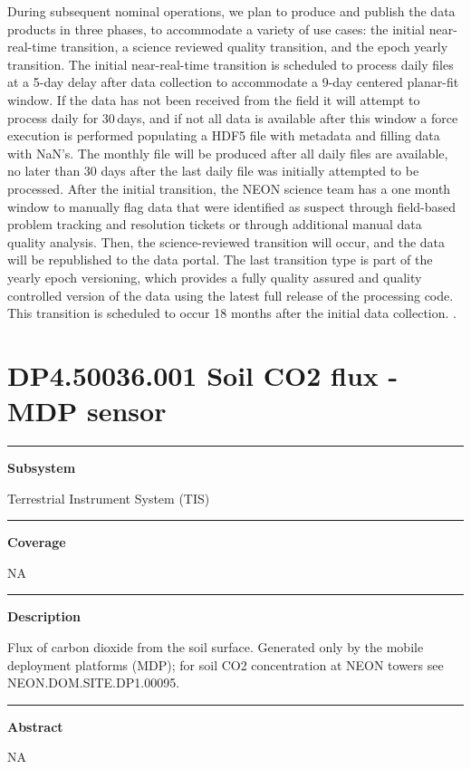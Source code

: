 \documentclass[]{article}
\begin{document}
During subsequent nominal operations, we plan to produce and publish the
data products in three phases, to accommodate a variety of use cases:
the initial near-real-time transition, a science reviewed quality
transition, and the epoch yearly transition. The initial near-real-time
transition is scheduled to process daily files at a 5-day delay after
data collection to accommodate a 9-day centered planar-fit window. If
the data has not been received from the field it will attempt to process
daily for 30\,days, and if not all data is available after this window a
force execution is performed populating a HDF5 file with metadata and
filling data with NaN's. The monthly file will be produced after all
daily files are available, no later than 30 days after the last daily
file was initially attempted to be processed. After the initial
transition, the NEON science team has a one month window to manually
flag data that were identified as suspect through field-based problem
tracking and resolution tickets or through additional manual data
quality analysis. Then, the science-reviewed transition will occur, and
the data will be republished to the data portal. The last transition
type is part of the yearly epoch versioning, which provides a fully
quality assured and quality controlled version of the data using the
latest full release of the processing code. This transition is scheduled
to occur 18 months after the initial data collection. \newpage
.

\section{DP4.50036.001 Soil CO2 flux - MDP
sensor}\label{dp4.50036.001-soil-co2-flux---mdp-sensor}

\begin{center}\rule{0.5\linewidth}{\linethickness}\end{center}

\textbf{Subsystem}

Terrestrial Instrument System (TIS)

\begin{center}\rule{0.5\linewidth}{\linethickness}\end{center}

\textbf{Coverage}

NA

\begin{center}\rule{0.5\linewidth}{\linethickness}\end{center}

\textbf{Description}

Flux of carbon dioxide from the soil surface. Generated only by the
mobile deployment platforms (MDP); for soil CO2 concentration at NEON
towers see NEON.DOM.SITE.DP1.00095.

\begin{center}\rule{0.5\linewidth}{\linethickness}\end{center}

\textbf{Abstract}

NA
\end{document}
